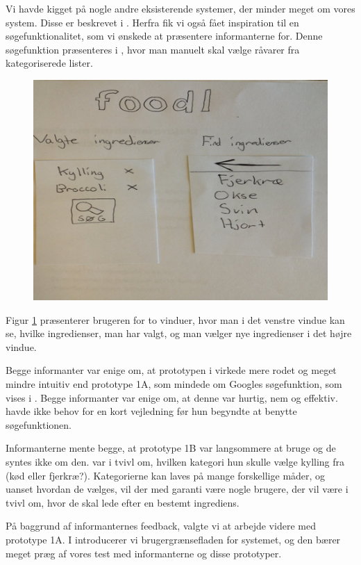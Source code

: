 Vi havde kigget på nogle andre eksisterende systemer, der minder meget om vores system. Disse er beskrevet i . Herfra fik vi også fået inspiration til en søgefunktionalitet, som vi ønskede at præsentere informanterne for. Denne søgefunktion præsenteres i , hvor man manuelt skal vælge råvarer fra kategoriserede lister.

\begin{figure}[H]
	\centering
	\includegraphics[scale=0.7]{billeder/prototyper/prototype1b.png}
	\label{fig:prototype1bdesign}
\end{figure}

Figur \ref{fig:prototype1bdesign} præsenterer brugeren for to vinduer, hvor man i det venstre vindue kan se, hvilke ingredienser, man har valgt, og man vælger nye ingredienser i det højre vindue.

Begge informanter var enige om, at prototypen i  virkede mere rodet og meget mindre intuitiv end prototype 1A, som mindede om Googles søgefunktion, som vises i . Begge informanter var enige om, at denne var hurtig, nem og effektiv. \Informantet{} havde ikke behov for en kort vejledning før hun begyndte at benytte søgefunktionen.

Informanterne mente begge, at prototype 1B var langsommere at bruge og de syntes ikke om den. \Informantet{} var i tvivl om, hvilken kategori hun skulle vælge \fx kylling fra (\fx kød eller fjerkræ?). Kategorierne kan laves på mange forskellige måder, og uanset hvordan de vælges, vil der med garanti være nogle brugere, der vil være i tvivl om, hvor de skal lede efter en bestemt ingrediens.

På baggrund af informanternes feedback, valgte vi at arbejde videre med prototype 1A. I  introducerer vi brugergrænsefladen for systemet, og den bærer meget præg af vores test med informanterne og disse prototyper.